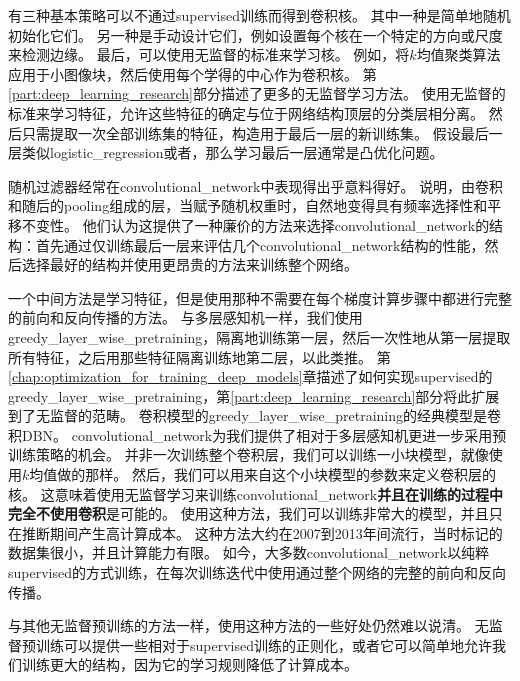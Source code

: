 有三种基本策略可以不通过\gls{supervised}训练而得到卷积核。
其中一种是简单地随机初始化它们。
另一种是手动设计它们，例如设置每个核在一个特定的方向或尺度来检测边缘。
最后，可以使用无监督的标准来学习核。
例如，\cite{Coates2011}将$k$均值聚类算法应用于小图像块，然后使用每个学得的中心作为卷积核。
第\ref{part:deep_learning_research}部分描述了更多的无监督学习方法。
使用无监督的标准来学习特征，允许这些特征的确定与位于网络结构顶层的分类层相分离。
然后只需提取一次全部训练集的特征，构造用于最后一层的新训练集。
假设最后一层类似\gls{logistic_regression}或者，那么学习最后一层通常是凸优化问题。
 
 
随机过滤器经常在\gls{convolutional_network}中表现得出乎意料得好\cite{Jarrett-ICCV2009-small,Saxe-ICML2011,pinto2011scaling,cox2011beyond}。
\cite{Saxe-ICML2011}说明，由卷积和随后的\gls{pooling}组成的层，当赋予随机权重时，自然地变得具有频率选择性和平移不变性。
他们认为这提供了一种廉价的方法来选择\gls{convolutional_network}的结构：首先通过仅训练最后一层来评估几个\gls{convolutional_network}结构的性能，然后选择最好的结构并使用更昂贵的方法来训练整个网络。

一个中间方法是学习特征，但是使用那种不需要在每个梯度计算步骤中都进行完整的前向和反向传播的方法。
与多层感知机一样，我们使用\gls{greedy_layer_wise_pretraining}，隔离地训练第一层，然后一次性地从第一层提取所有特征，之后用那些特征隔离训练地第二层，以此类推。
第\ref{chap:optimization_for_training_deep_models}章描述了如何实现\gls{supervised}的\gls{greedy_layer_wise_pretraining}，第\ref{part:deep_learning_research}部分将此扩展到了无监督的范畴。
卷积模型的\gls{greedy_layer_wise_pretraining}的经典模型是卷积\gls{DBN}\citep{HonglakL2009}。
\gls{convolutional_network}为我们提供了相对于多层感知机更进一步采用预训练策略的机会。
并非一次训练整个卷积层，我们可以训练一小块模型，就像\cite{Coates2011}使用$k$均值做的那样。
然后，我们可以用来自这个小块模型的参数来定义卷积层的核。
这意味着使用无监督学习来训练\gls{convolutional_network}\textbf{并且在训练的过程中完全不使用卷积}是可能的。
使用这种方法，我们可以训练非常大的模型，并且只在推断期间产生高计算成本\citep{ranzato-cvpr-07-small,Jarrett-ICCV2009-small,koray-nips-10-small,icml2013_coates13}。
这种方法大约在2007到2013年间流行，当时标记的数据集很小，并且计算能力有限。
如今，大多数\gls{convolutional_network}以纯粹\gls{supervised}的方式训练，在每次训练迭代中使用通过整个网络的完整的前向和反向传播。
 
 
与其他无监督预训练的方法一样，使用这种方法的一些好处仍然难以说清。
无监督预训练可以提供一些相对于\gls{supervised}训练的正则化，或者它可以简单地允许我们训练更大的结构，因为它的学习规则降低了计算成本。

